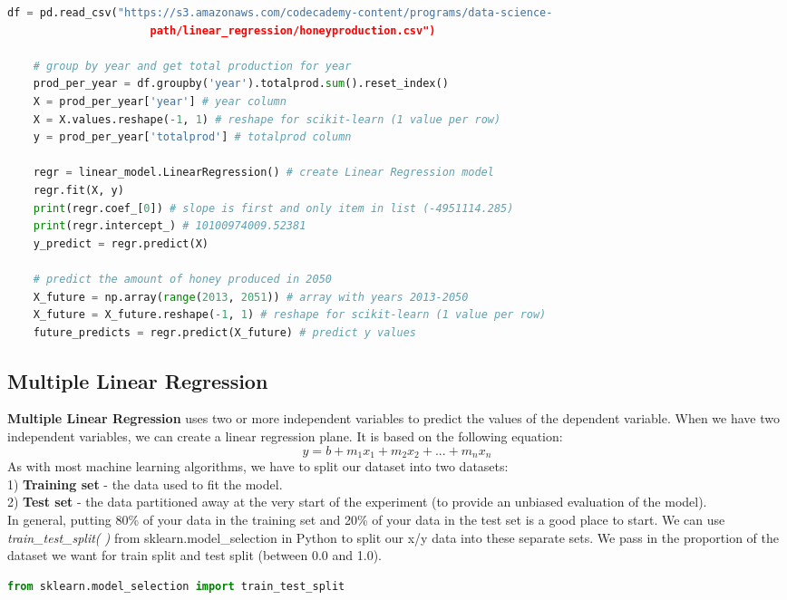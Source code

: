 \documentclass[11pt, a4paper]{article}
\begin{document}
\begin{spacing}{1.1}
\begin{lstlisting}[language=Python]
	df = pd.read_csv("https://s3.amazonaws.com/codecademy-content/programs/data-science-
	                  path/linear_regression/honeyproduction.csv")
	
	# group by year and get total production for year
	prod_per_year = df.groupby('year').totalprod.sum().reset_index()
	X = prod_per_year['year'] # year column
	X = X.values.reshape(-1, 1) # reshape for scikit-learn (1 value per row)
	y = prod_per_year['totalprod'] # totalprod column
	
	regr = linear_model.LinearRegression() # create Linear Regression model
	regr.fit(X, y)
	print(regr.coef_[0]) # slope is first and only item in list (-4951114.285)
	print(regr.intercept_) # 10100974009.52381
	y_predict = regr.predict(X)
	
	# predict the amount of honey produced in 2050
	X_future = np.array(range(2013, 2051)) # array with years 2013-2050
	X_future = X_future.reshape(-1, 1) # reshape for scikit-learn (1 value per row)
	future_predicts = regr.predict(X_future) # predict y values \end{lstlisting} \newpage
	\subsection{Multiple Linear Regression}
	\textbf{Multiple Linear Regression} uses two or more independent variables to predict the values of the dependent variable. When we have two independent variables, we can create a linear regression plane. It is based on the following equation: $$ y = b + m_1x_1 + m_2x_2 + ... + m_nx_n$$ 
	As with most machine learning algorithms, we have to split our dataset into two datasets: \\
	\hspace*{2mm} 1) \textbf{Training set} - the data used to fit the model. \\
	\hspace*{2mm} 2) \textbf{Test set} - the data partitioned away at the very start of the experiment (to provide an unbiased \hspace*{27mm} evaluation of the model). \vspace*{1mm} \\
	In general, putting 80\% of your data in the training set and 20\% of your data in the test set is a good place to start. We can use \textit{train\_test\_split( )} from sklearn.model\_selection in Python to split our x/y data into these separate sets. We pass in the proportion of the dataset we want for train split and test split (between 0.0 and 1.0). 
	\begin{lstlisting}[language=Python]
	from sklearn.model_selection import train_test_split
	

\end{lstlisting}
\end{spacing}
\end{document}
